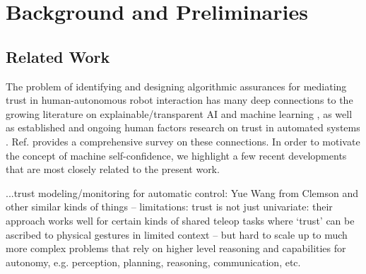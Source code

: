 \section{Background and Preliminaries} \label{sec:background}

\subsection{Related Work}
The problem of identifying and designing algorithmic assurances for mediating trust in human-autonomous robot interaction has many deep connections to the growing literature on explainable/transparent AI and machine learning , as well as established and ongoing human factors research on trust in automated systems . 
Ref. \cite{Israelsen2018-qz} provides a comprehensive survey on these connections. 
In order to motivate the concept of machine self-confidence, we highlight a few recent developments that are most closely related to the present work. 

...trust modeling/monitoring for automatic control: Yue Wang from Clemson and other similar kinds of things -- limitations: trust is not just univariate: their approach works well for certain kinds of shared teleop tasks where `trust' can be ascribed to physical gestures in limited context -- but hard to scale up to much more complex problems that rely on higher level reasoning and capabilities for autonomy, e.g. perception, planning, reasoning, communication, etc. 

